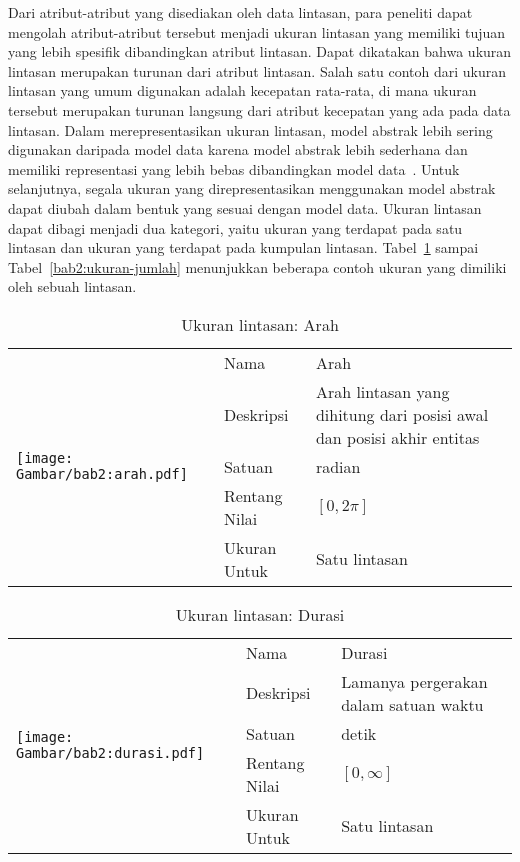 Dari atribut-atribut yang disediakan oleh data lintasan, para peneliti dapat mengolah atribut-atribut tersebut menjadi ukuran lintasan yang memiliki tujuan yang lebih spesifik dibandingkan atribut lintasan. Dapat dikatakan bahwa ukuran lintasan merupakan turunan dari atribut lintasan. Salah satu contoh dari ukuran lintasan yang umum digunakan adalah kecepatan rata-rata, di mana ukuran tersebut merupakan turunan langsung dari atribut kecepatan yang ada pada data lintasan. Dalam merepresentasikan ukuran lintasan, model abstrak lebih sering digunakan daripada model data karena model abstrak lebih sederhana dan memiliki representasi yang lebih bebas dibandingkan model data~\cite{wiratma:trajectory}. Untuk selanjutnya, segala ukuran yang direpresentasikan menggunakan model abstrak dapat diubah dalam bentuk yang sesuai dengan model data. Ukuran lintasan dapat dibagi menjadi dua kategori, yaitu ukuran yang terdapat pada satu lintasan dan ukuran yang terdapat pada kumpulan lintasan. Tabel~\ref{bab2:ukuran-arah} sampai Tabel~\ref{bab2:ukuran-jumlah} menunjukkan beberapa contoh ukuran yang dimiliki oleh sebuah lintasan.

\begin{table}[htbp]
    \centering
    \caption{Ukuran lintasan: Arah}
    \begin{tabular}{|m{4cm}|l|p{8.5cm}|} 
        \hline
        \multirow{5}{*}{
            \texttt{[image: Gambar/bab2:arah.pdf]}
        } & Nama & Arah \\ 
        \cline{2-3}
        & Deskripsi & Arah lintasan yang dihitung dari posisi awal dan posisi akhir entitas                    \\ 
        \cline{2-3}
        & Satuan & radian                    \\ 
        \cline{2-3}
        & Rentang Nilai & $[0, 2\pi]$                    \\ 
        \cline{2-3}
        & Ukuran Untuk & Satu lintasan                    \\
        \hline
    \end{tabular}
    \label{bab2:ukuran-arah}
\end{table}

\begin{table}[htbp]
    \centering
    \caption{Ukuran lintasan: Durasi}
    \begin{tabular}{|m{4cm}|l|p{8.5cm}|} 
        \hline
        \multirow{5}{*}{
            \texttt{[image: Gambar/bab2:durasi.pdf]}
        } & Nama & Durasi \\ 
        \cline{2-3}
        & Deskripsi & Lamanya pergerakan dalam satuan waktu                    \\ 
        \cline{2-3}
        & Satuan & detik                    \\ 
        \cline{2-3}
        & Rentang Nilai & $[0, \infty]$                    \\ 
        \cline{2-3}
        & Ukuran Untuk & Satu lintasan                    \\
        \hline
    \end{tabular}
    \label{bab2:ukuran-durasi}
\end{table}

